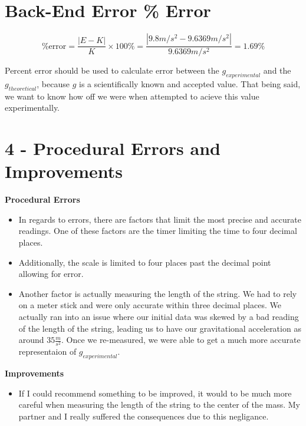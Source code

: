 \section*{Back-End Error \% Error}

  \begin{equation*}
      \% \text{error} = \frac{|E - K|}{K} \times 100 \% = \frac{|9.8 m/s^2 - 9.6369 m/s^2|}{9.6369 m/s^2} = 1.69\%
  \end{equation*}

\noindent Percent error should be used to calculate error between the $g_{experimental}$
and the $g_{theoretical}$, because $g$ is a scientifically known and accepted value. That being
said, we want to know how off we were when attempted to acieve this value experimentally.

\newpage 

\section*{4 - Procedural Errors and Improvements}

\noindent \textbf{Procedural Errors}
\begin{itemize}
  \item In regards to errors, there are factors that limit the most precise and 
        accurate readings. One of these factors are the timer limiting the time
        to four decimal places.
  \item Additionally, the scale is limited to four places past the decimal point
        allowing for error.
  \item Another factor is actually measuring the length of the string. We had to
        rely on a meter stick and were only accurate within three decimal places.
        We actually ran into an issue where our initial data was skewed by a bad 
        reading of the length of the string, leading us to have our gravitational
        acceleration as around $35 \frac{m}{s^2}$. Once we re-measured, we were able to get
        a much more accurate representaion of $g_{experimental}$.
\end{itemize}

\noindent \textbf{Improvements}
\begin{itemize}
  \item If I could recommend something to be improved, it would to be much more
        careful when measuring the length of the string to the center of the mass.
        My partner and I really suffered the consequences due to this negligance.
\end{itemize}

